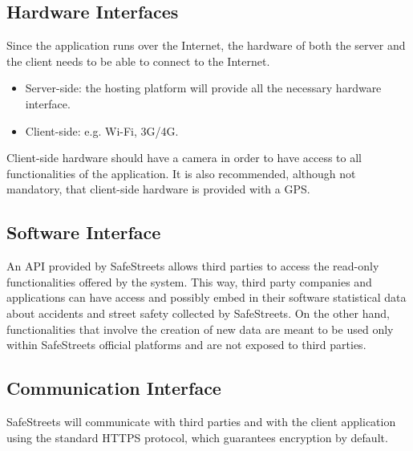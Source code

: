 \subsection{Hardware Interfaces}
Since the application runs over the Internet, the hardware of both the server and the client needs to be able to connect to the Internet.
\begin{itemize}
  \item Server-side: the hosting platform will provide all the necessary hardware interface.
  \item Client-side: e.g. Wi-Fi, 3G/4G. 
\end{itemize}
Client-side hardware should have a camera in order to have access to all functionalities of the application. It is also recommended, although not mandatory, that client-side hardware is provided with a GPS.


\subsection{Software Interface}
An API provided by SafeStreets allows third parties to access the read-only functionalities offered by the system. This way, third party companies and applications can have access and possibly embed in their software statistical data about accidents and street safety collected by SafeStreets. 
On the other hand, functionalities that involve the creation of new data are meant to be used only within SafeStreets official platforms and are not exposed to third parties.

\subsection{Communication Interface}
SafeStreets will communicate with third parties and with the client application using the standard HTTPS protocol, which guarantees encryption by default.